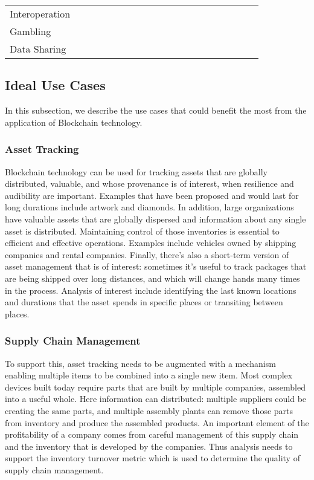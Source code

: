 \begin{table*}[th!]
\begin{tabular}{l|cccccccc|ccccccccccc|}
\hline

Interoperation			&	&\full	&	&	&	&	&	&		&	&	&	&	&	&	&	&	&	&	&	\\
Gambling				&	&\full	&	&\full	&	&	&	&		&	&	&	&	&	&	&	&	&	&	&	\\ 
Data Sharing			&	&	&	&\full	&	&\full	&	&		&	&	&	&	&	&	&	&	&	&	&	\\ 

\hline

\end{tabular}
\end{table*}

\subsection{Ideal Use Cases}
In this subsection, we describe the use cases that could benefit the most from the application of Blockchain technology.

\subsubsection{Asset Tracking} Blockchain technology can be used for tracking assets that are globally distributed, valuable, and whose provenance is of interest, when resilience and audibility are important.  Examples that have been proposed and would last for long durations include artwork and diamonds.  In addition, large organizations have valuable assets that are globally dispersed and information about any single asset is distributed.  Maintaining control of those inventories is essential to efficient and effective operations.  Examples include vehicles owned by shipping companies and rental companies.  Finally, there's also a short-term version of asset management that is of interest: sometimes it's useful to track packages that are being shipped over long distances, and which will change hands many times in the process.  Analysis of interest include identifying the last known locations and durations that the asset spends in specific places or transiting between places.

\subsubsection{Supply Chain Management}
To support this, asset tracking needs to be augmented with a mechanism enabling multiple items to be combined into a single new item.  Most complex devices built today require parts that are built by multiple companies, assembled into a useful whole. Here information can distributed: multiple suppliers could be creating the same parts, and multiple assembly plants can remove those parts from inventory and produce the assembled products.  An important element of the profitability of a company comes from careful management of this supply chain and the inventory that is developed by the companies.  Thus analysis needs to support the inventory turnover metric which is used to determine the quality of supply chain management.

